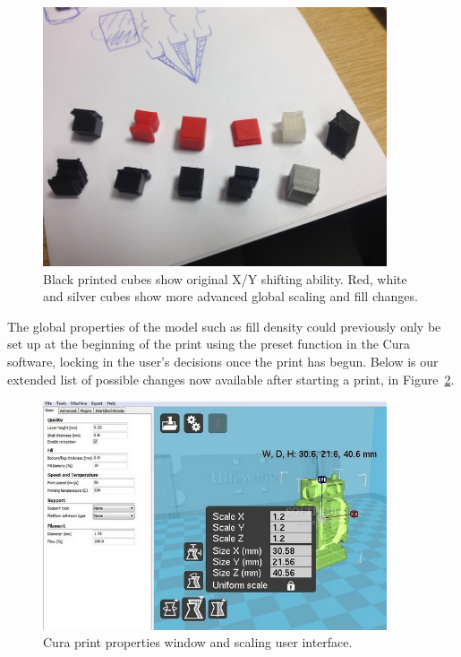 \documentclass[11pt]{report} %
\begin{document}
\begin{figure}[H]
  \centering
  \includegraphics[width=4in]{RedWhiteSilver.png}
  \caption{Black printed cubes show original X/Y shifting ability. Red, white and silver cubes show more advanced global scaling and fill changes.}
  \label{figure:RedWhiteSilver}
\end{figure}

The global properties of the model such as fill density could previously only be set up at the beginning of the print using the preset function in the Cura software, locking in the user's decisions once the print has begun. Below is our extended list of possible changes now available after starting a print, in Figure~\ref{figure:CuraScalingRobot}.

\begin{figure}[H]
  \centering
  \includegraphics[width=4in]{CuraScalingRobot.png}
  \caption{Cura print properties window and scaling user interface.}
  \label{figure:CuraScalingRobot}
\end{figure}
\end{document}

